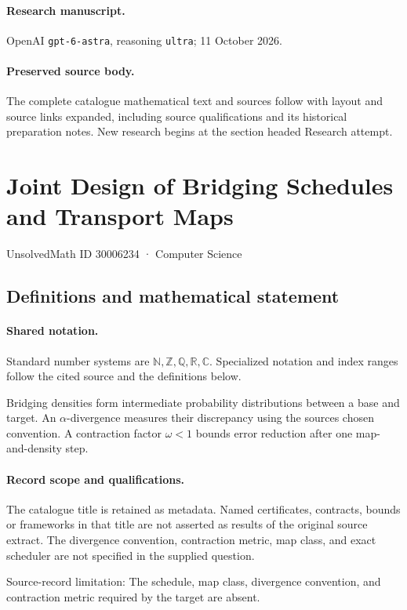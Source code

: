 \documentclass[11pt]{article}
\begin{document}
\paragraph{Research manuscript.} OpenAI \texttt{gpt-6-astra}, reasoning \texttt{ultra}; 11 October 2026.
\paragraph{Preserved source body.} The complete catalogue mathematical text and sources follow with layout and source links expanded, including source qualifications and its historical preparation notes. New research begins at the section headed Research attempt.

\section{Joint Design of Bridging Schedules and Transport Maps}\label{30006234}
{\small UnsolvedMath ID 30006234 · Computer Science}
\subsection{Definitions and mathematical statement}

\paragraph{Shared notation.}Standard number systems are $\mathbb N,\mathbb Z,\mathbb Q,\mathbb R,\mathbb C$. Specialized notation and index ranges follow the cited source and the definitions below.


Bridging densities form intermediate probability distributions between a base and target. An $\alpha$-divergence measures their discrepancy using the source\textquotesingle s chosen convention. A contraction factor $\omega<1$ bounds error reduction after one map-and-density step.
\paragraph{Record scope and qualifications.}
The catalogue title is retained as metadata. Named certificates, contracts, bounds or frameworks in that title are not asserted as results of the original source extract.
The divergence convention, contraction metric, map class, and exact scheduler are not specified in the supplied question.

Source-record limitation: The schedule, map class, divergence convention, and contraction metric required by the target are absent.
\end{document}
